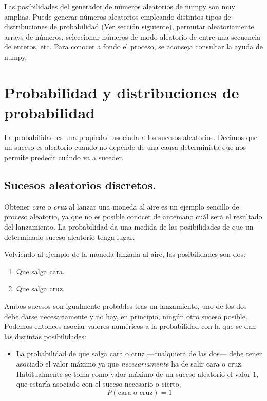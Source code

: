 \begin{paracol}{2}
Las posibilidades del generador de números aleatorios de numpy son muy amplias. Puede generar números aleatorios empleando distintos tipos de distribuciones de probabilidad (Ver sección siguiente), permutar aleatoriamente arrays de números, seleccionar números de modo aleatorio de entre una secuencia de enteros, etc. Para conocer a fondo el proceso, se aconseja consultar la ayuda de numpy.

\section{Probabilidad y distribuciones de probabilidad}
La probabilidad es una propiedad asociada a los sucesos aleatorios. Decimos que un suceso es aleatorio cuando no depende de una causa determinista que nos permite predecir cuándo va a suceder. 

\subsection{Sucesos aleatorios discretos.}
Obtener \emph{cara} o \emph{cruz} al lanzar una moneda al aire es un ejemplo sencillo de proceso aleatorio, ya que no es posible conocer de antemano cuál será el resultado del lanzamiento. La probabilidad da una medida de las posibilidades de que un determinado suceso aleatorio tenga lugar.

Volviendo al ejemplo de la moneda  lanzada al aire, las posibilidades son dos:
\begin{enumerate}
\item Que salga cara.
\item Que salga cruz.
\end{enumerate}
Ambos sucesos son igualmente probables tras un lanzamiento, uno de los dos debe darse necesariamente y no hay, en principio, ningún otro suceso posible. Podemos entonces asociar valores numéricos a la probabilidad con la que se dan las distintas posibilidades:
\begin{itemize}
\item La probabilidad de que salga cara o cruz ---cualquiera de las dos--- debe tener asociado el valor máximo ya que \emph{necesariamente} ha de salir cara o cruz.  Habitualmente se toma como valor máximo de un suceso aleatorio el valor $1$, que estaría asociado con el suceso necesario o cierto,
\begin{equation*}
P(\text{cara o cruz}) = 1
\end{equation*}


\end{itemize}
\end{paracol}
